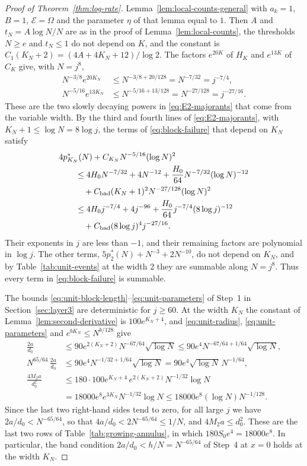 \begin{proof}[Proof of Theorem~\ref{thm:log-rate}]
Lemma~\ref{lem:local-counts-general} with $a_k=1$, $B=1$,
$\mathcal E=\Omega$ and the parameter $\eta$ of that lemma equal to $1$. Then $A$ and $t_N=A\log N/N$ are as in the proof of
Lemma~\ref{lem:local-counts}, the thresholds $N\ge e$ and $t_N\le1$
do not depend on $K$, and the constant is $C_1(K_N+2)=(4A+4K_N+12)/\log2$.
The factors $e^{20K}$ of $H_K$ and $e^{13K}$ of $C_K$ give, with $N=j^8$,
\begin{align*}
 N^{-3/8}e^{20K_N}&\le N^{-3/8+20/128}=N^{-7/32}=j^{-7/4},\\
 N^{-5/16}e^{13K_N}&\le N^{-5/16+13/128}=N^{-27/128}=j^{-27/16}.
\end{align*}
These are the two slowly decaying powers in \eqref{eq:E2-majorants} that
come from the variable width.
By the third and fourth lines of \eqref{eq:E2-majorants}, with
$K_N+1\le\log N=8\log j$, the terms of \eqref{eq:block-failure} that
depend on $K_N$ satisfy
\begin{align*}
 &4p_{K_N}^*(N)+C_{K_N}N^{-5/16}(\log N)^2\\
 &\qquad\le4H_0N^{-7/32}+4N^{-12}
  +\frac{H_0}{64}N^{-7/32}(\log N)^{-12}\\
 &\qquad\quad+C_{\rm bad}(K_N+1)^2N^{-27/128}(\log N)^2\\
 &\qquad\le4H_0j^{-7/4}+4j^{-96}
  +\frac{H_0}{64}j^{-7/4}(8\log j)^{-12}\\
 &\qquad\quad+C_{\rm bad}(8\log j)^4j^{-27/16}.
\end{align*}
Their exponents in $j$ are less than $-1$, and their remaining factors are
polynomial in $\log j$.
The other terms, $5p_2^*(N)+N^{-3}+2N^{-10}$, do not depend on $K_N$, and
by Table~\ref{tab:unit-events} at the width $2$ they are summable
along $N=j^8$.
Thus every term in \eqref{eq:block-failure} is summable.

The bounds
\eqref{eq:unit-block-length}--\eqref{eq:unit-parameters} of Step~1 in
Section~\ref{sec:layer3} are deterministic for $j\ge60$. At the
width $K_N$ the constant of Lemma~\ref{lem:second-derivative} is
$100e^{K_N+4}$, and \eqref{eq:unit-radius}, \eqref{eq:unit-parameters}
and $e^{bK_N}\le N^{b/128}$ give
\begin{align*}
 \frac{2a}{d_0}&\le90e^{2(K_N+2)}N^{-67/64}\sqrt{\log N}
 \le90e^4N^{-67/64+1/64}\sqrt{\log N},\\
 N^{65/64}\,\frac{2a}{d_0}&\le90e^4N^{-1/32+1/64}\sqrt{\log N}
 =90e^4\sqrt{\log N}\,N^{-1/64},\\
 \frac{4M_2a}{d_0^2}
 &\le180\cdot100e^{K_N+4}\,e^{2(K_N+2)}N^{-1/32}\log N\\
 &=18000e^8e^{3K_N}N^{-1/32}\log N
 \le18000e^8(\log N)N^{-1/128}.
\end{align*}
Since the last two right-hand sides tend to zero, for all large $j$ we
have $2a/d_0<N^{-65/64}$, so that $4a/d_0<2N^{-65/64}\le1/N$, and
$4M_2a\le d_0^2$.
These are the last two rows of Table~\ref{tab:growing-annulus}, in which
$180S_0e^4=18000e^8$.
In particular, the band condition $2a/d_0<h/N=N^{-65/64}$ of Step~4 at
$x=0$ holds at the width $K_N$.


\end{proof}
